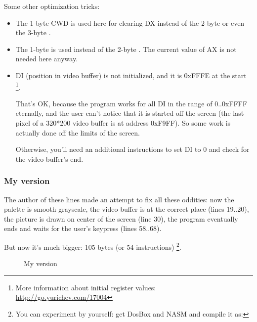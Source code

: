 Some other optimization tricks:

\begin{itemize}
\item The 1-byte CWD is used here 
for clearing DX instead of the 2-byte  or even the 3-byte .

\item The 1-byte  is used instead of the 2-byte 
. 
The current value of AX is not needed here anyway.

\item DI (position in video buffer) is not initialized, and it is 0xFFFE at the start
\footnote{More information about initial register values: 
\url{http://go.yurichev.com/17004}}.

That's OK, because the program works for all DI in the range of 0..0xFFFF eternally, 
and the user can't notice
that it is started off the screen (the last pixel of a 320*200 video buffer is at address 0xF9FF).
So some work is actually done 
off the limits of the screen.

Otherwise, you'll need an additional instructions to set DI to 0 and check for the video buffer's end.

\end{itemize}

\newcommand{\MyFixedVersion}{My  version}
\subsubsection{\MyFixedVersion}




The author of these lines made an attempt to fix all these oddities: now the palette is smooth grayscale, the video buffer is at the correct place 
(lines 19..20),
the picture is drawn on center of the screen (line 30), the program eventually ends and waits for the user's keypress 
(lines 58..68).

But now it's much bigger: 105 bytes (or 54 instructions)
\footnote{
You can experiment by yourself: get DosBox and NASM and compile it as: 
}.

\begin{figure}[H]
\centering
{}
\caption{\MyFixedVersion}
\label{fig:mandelbrot_fixed}
\end{figure}
